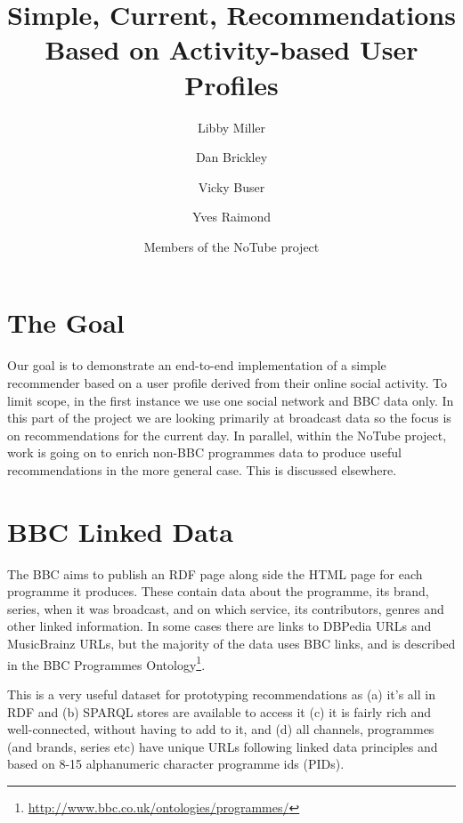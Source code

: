 \documentclass[]{article}
\title{Simple, Current, Recommendations Based on Activity-based User Profiles}
\author[1]{Libby Miller}
\author[2]{Dan Brickley}
\author[1]{Vicky Buser}
\author[1]{Yves Raimond}
\author[3]{Members of the NoTube project}
\affil[1]{BBC, UK}
\affil[2]{Vrije Universiteit, Amsterdam}
\affil[3]{http://notube.tv}
\begin{document}
\ifpdf
{}
\else
{}
\fi

\maketitle


\section{The Goal}

Our goal is to demonstrate an end-to-end implementation of a simple recommender based on a user profile derived from their online social activity. To limit scope, in the first instance we use one social network and BBC data only. In this part of the project we are looking primarily at broadcast data so the focus is on recommendations for the current day. In parallel, within the NoTube project, work is going on to enrich non-BBC programmes data to produce useful recommendations in the more general case. This is discussed elsewhere.

\section{BBC Linked Data}

The BBC aims to publish an RDF page along side the HTML page for each programme it produces. These contain data about the programme, its brand, series, when it was broadcast, and on which service, its contributors, genres and other linked information. In some cases there are links to DBPedia URLs and MusicBrainz URLs, but the majority of the data uses BBC links, and is described in the BBC Programmes Ontology\footnote{\url{http://www.bbc.co.uk/ontologies/programmes/}}.

This is a very useful dataset for prototyping recommendations as (a) it's all in RDF and (b) SPARQL stores are available to access it (c) it is fairly rich and well-connected, without having to add to it, and (d) all channels, programmes (and brands, series etc) have unique URLs following linked data principles and based on 8-15 alphanumeric character programme ids (PIDs).
\end{document}
